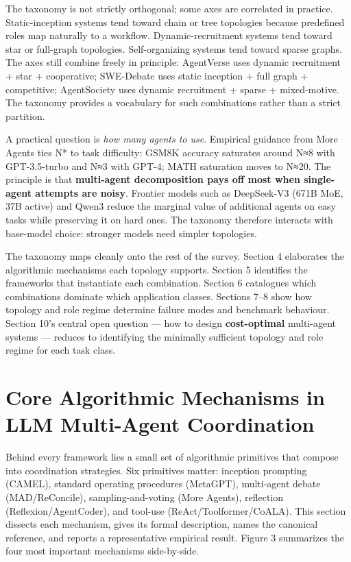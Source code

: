 \documentclass{article}
\begin{document}
The taxonomy is not strictly orthogonal; some axes are correlated in practice. Static-inception systems tend toward chain or tree topologies because predefined roles map naturally to a workflow. Dynamic-recruitment systems tend toward star or full-graph topologies. Self-organizing systems tend toward sparse graphs. The axes still combine freely in principle: AgentVerse uses dynamic recruitment + star + cooperative; SWE-Debate uses static inception + full graph + competitive; AgentSociety uses dynamic recruitment + sparse + mixed-motive. The taxonomy provides a vocabulary for such combinations rather than a strict partition.

A practical question is \emph{how many agents to use}. Empirical guidance from More Agents \citep{li2024asurveyonllmbasedm} ties N* to task difficulty: GSM8K accuracy saturates around N≈8 with GPT-3.5-turbo and N≈3 with GPT-4; MATH saturation moves to N≈20. The principle is that \textbf{multi-agent decomposition pays off most when single-agent attempts are noisy}. Frontier models such as DeepSeek-V3 (671B MoE, 37B active) and Qwen3 reduce the marginal value of additional agents on easy tasks while preserving it on hard ones. The taxonomy therefore interacts with base-model choice: stronger models need simpler topologies.

The taxonomy maps cleanly onto the rest of the survey. Section 4 elaborates the algorithmic mechanisms each topology supports. Section 5 identifies the frameworks that instantiate each combination. Section 6 catalogues which combinations dominate which application classes. Sections 7--8 show how topology and role regime determine failure modes and benchmark behaviour. Section 10's central open question --- how to design \textbf{cost-optimal} multi-agent systems --- reduces to identifying the minimally sufficient topology and role regime for each task class.

\section{Core Algorithmic Mechanisms in LLM Multi-Agent Coordination}\label{core-algorithmic-mechanisms-in-llm-multi-agent-coordination}

Behind every framework lies a small set of algorithmic primitives that compose into coordination strategies. Six primitives matter: inception prompting (CAMEL), standard operating procedures (MetaGPT), multi-agent debate (MAD/ReConcile), sampling-and-voting (More Agents), reflection (Reflexion/AgentCoder), and tool-use (ReAct/Toolformer/CoALA). This section dissects each mechanism, gives its formal description, names the canonical reference, and reports a representative empirical result. Figure 3 summarizes the four most important mechanisms side-by-side.
\end{document}
